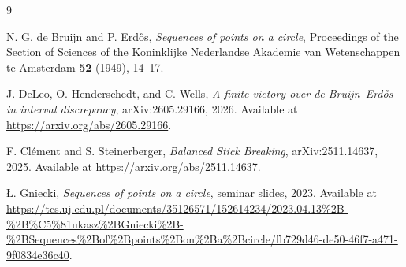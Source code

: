 \documentclass[11pt]{article}
\theoremstyle{remark}
\begin{document}
\begin{thebibliography}{9}

N. G. de Bruijn and P. Erd\H{o}s,
\emph{Sequences of points on a circle},
Proceedings of the Section of Sciences of the Koninklijke Nederlandse Akademie van Wetenschappen te Amsterdam \textbf{52} (1949), 14--17.

J. DeLeo, O. Henderschedt, and C. Wells,
\emph{A finite victory over de Bruijn--Erd\H{o}s in interval discrepancy},
arXiv:2605.29166, 2026.
Available at \url{https://arxiv.org/abs/2605.29166}.

F. Cl\'ement and S. Steinerberger,
\emph{Balanced Stick Breaking},
arXiv:2511.14637, 2025.
Available at \url{https://arxiv.org/abs/2511.14637}.

\L. Gniecki,
\emph{Sequences of points on a circle},
seminar slides, 2023.
Available at
\url{https://tcs.uj.edu.pl/documents/35126571/152614234/2023.04.13%2B-%2B%C5%81ukasz%2BGniecki%2B-%2BSequences%2Bof%2Bpoints%2Bon%2Ba%2Bcircle/fb729d46-de50-46f7-a471-9f0834e36c40}.

\end{thebibliography}
\end{document}
